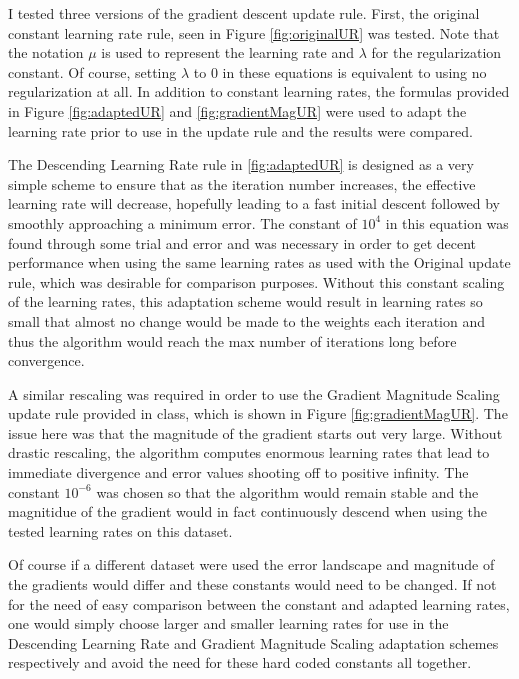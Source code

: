 \documentclass[runningheads]{llncs}
\begin{document}
I tested three versions of the gradient descent update rule. First, the original constant learning rate rule, seen in Figure \ref{fig:originalUR} was tested. Note that the notation $\mu$ is used to represent the learning rate and $\lambda$ for the regularization constant. Of course, setting $\lambda$ to 0 in these equations is equivalent to using no regularization at all. In addition to constant learning rates, the formulas provided in Figure \ref{fig:adaptedUR} and \ref{fig:gradientMagUR} were used to adapt the learning rate prior to use in the update rule and the results were compared.

The Descending Learning Rate rule in \ref{fig:adaptedUR} is designed as a very simple scheme to ensure that as the iteration number increases, the effective learning rate will decrease, hopefully leading to a fast initial descent followed by smoothly approaching a minimum error. The constant of $10^{4}$ in this equation was found through some trial and error and was necessary in order to get decent performance when using the same learning rates as used with the Original update rule, which was desirable for comparison purposes. Without this constant scaling of the learning rates, this adaptation scheme would result in learning rates so small that almost no change would be made to the weights each iteration and thus the algorithm would reach the max number of iterations long before convergence. 

A similar rescaling was required in order to use the Gradient Magnitude Scaling update rule provided in class, which is shown in Figure \ref{fig:gradientMagUR}. The issue here was that the magnitude of the gradient starts out very large. Without drastic rescaling, the algorithm computes enormous learning rates that lead to immediate divergence and error values shooting off to positive infinity. The constant $10^{-6}$ was chosen so that the algorithm would remain stable and the magnitidue of the gradient would in fact continuously descend when using the tested learning rates on this dataset. 

Of course if a different dataset were used the error landscape and magnitude of the gradients would differ and these constants would need to be changed. If not for the need of easy comparison between the constant and adapted learning rates, one would simply choose larger and smaller learning rates for use in the Descending Learning Rate and Gradient Magnitude Scaling adaptation schemes respectively and avoid the need for these hard coded constants all together.   
\end{document}
